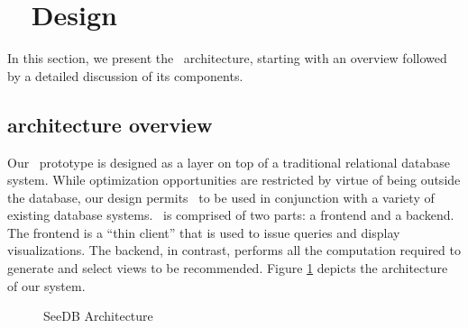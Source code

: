 
\section{{\large \SeeDB\ } Design}
\label{sec:system_architecture}

In this section, we present the \SeeDB\ architecture, starting with an
overview followed by a detailed discussion of its components.

\subsection{{\large \SeeDB} architecture overview}
\label{subsec:overview}

Our \SeeDB\ prototype is designed as a layer on top of a traditional
relational database system.
While optimization opportunities are restricted by virtue of being outside the
database, our design permits \SeeDB\ to be used in conjunction with a variety of
existing database systems. 
\SeeDB\ is comprised of two parts: a frontend and a backend. 
The frontend is a ``thin client'' that
is used to issue queries and display visualizations. The backend, in
contrast, performs all the computation required to generate and select views
to be recommended. Figure \ref{fig:sys-arch}
depicts the architecture of our system.

\begin{figure}[htb]
\vspace{-10pt}
\centerline{
\hbox{}}
\caption{SeeDB Architecture}
\label{fig:sys-arch}
\vspace{-15pt}
\end{figure} 

